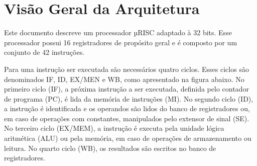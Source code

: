 \documentclass{report}
\begin{document}

\newpage
\section{Visão Geral da Arquitetura}
Este documento descreve um processador µRISC adaptado à 32 bits. Esse processador possui 16 registradores de propósito geral e é composto por um conjunto de 42 instruções. 

Para uma instrução ser executada são necessários quatro ciclos. Esses ciclos são denominados IF, ID, EX/MEN e WB, como apresentado na figura abaixo. No primeiro ciclo (IF),  a próxima instrução a ser executada, definida pelo contador de programa (PC), é lida da memória de instruções (MI). No segundo ciclo (ID), a instrução é identificada e os operandos são lidos do banco de registradores ou, em caso de operações com constantes, manipulados pelo extensor de sinal (SE). No terceiro ciclo (EX/MEM), a instrução é executa pela unidade lógica aritmética (ALU) ou pela memória, em caso de operações de armazenamento ou leitura. No quarto ciclo (WB), os resultados são escritos no banco de registradores.
\end{document}
